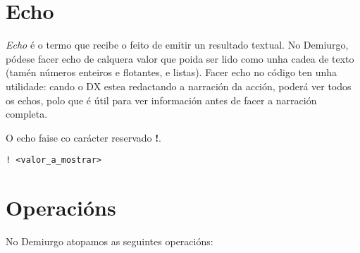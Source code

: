 \section{Echo}
\label{sec:echo}
{\it Echo} é o termo que recibe o feito de emitir un resultado textual. No
Demiurgo, pódese facer echo de calquera valor que poida ser lido como unha cadea
de texto (tamén números enteiros e flotantes, e listas). Facer echo no código
ten unha utilidade: cando o DX estea redactando a narración da acción, poderá
ver todos os echos, polo que é útil para ver información antes de facer a
narración completa.
\par O echo faise co carácter reservado {\bf !}.
\begin{lstlisting}
! <valor_a_mostrar>
\end{lstlisting}

\section{Operacións}
No Demiurgo atopamos as seguintes operacións:
